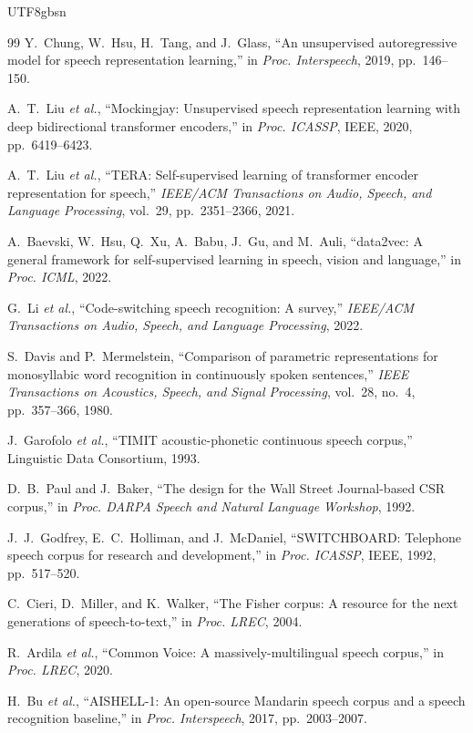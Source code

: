 \documentclass[12pt,a4paper]{article}
\newcommand{\etal}{\textit{et al.}}
\begin{document}
\begin{CJK}{UTF8}{gbsn}
\begin{thebibliography}{99}
Y.~Chung, W.~Hsu, H.~Tang, and J.~Glass,
``An unsupervised autoregressive model for speech representation learning,''
in \textit{Proc. Interspeech}, 2019, pp.~146--150.

A.~T.~Liu \etal,
``Mockingjay: Unsupervised speech representation learning with deep bidirectional transformer encoders,''
in \textit{Proc. ICASSP}, IEEE, 2020, pp.~6419--6423.

A.~T.~Liu \etal,
``TERA: Self-supervised learning of transformer encoder representation for speech,''
\textit{IEEE/ACM Transactions on Audio, Speech, and Language Processing}, vol.~29, pp.~2351--2366, 2021.

A.~Baevski, W.~Hsu, Q.~Xu, A.~Babu, J.~Gu, and M.~Auli,
``data2vec: A general framework for self-supervised learning in speech, vision and language,''
in \textit{Proc. ICML}, 2022.

G.~Li \etal,
``Code-switching speech recognition: A survey,''
\textit{IEEE/ACM Transactions on Audio, Speech, and Language Processing}, 2022.

S.~Davis and P.~Mermelstein,
``Comparison of parametric representations for monosyllabic word recognition in continuously spoken sentences,''
\textit{IEEE Transactions on Acoustics, Speech, and Signal Processing}, vol.~28, no.~4, pp.~357--366, 1980.

J.~Garofolo \etal,
``TIMIT acoustic-phonetic continuous speech corpus,''
Linguistic Data Consortium, 1993.

D.~B.~Paul and J.~Baker,
``The design for the Wall Street Journal-based CSR corpus,''
in \textit{Proc. DARPA Speech and Natural Language Workshop}, 1992.

J.~J.~Godfrey, E.~C.~Holliman, and J.~McDaniel,
``SWITCHBOARD: Telephone speech corpus for research and development,''
in \textit{Proc. ICASSP}, IEEE, 1992, pp.~517--520.

C.~Cieri, D.~Miller, and K.~Walker,
``The Fisher corpus: A resource for the next generations of speech-to-text,''
in \textit{Proc. LREC}, 2004.

R.~Ardila \etal,
``Common Voice: A massively-multilingual speech corpus,''
in \textit{Proc. LREC}, 2020.

H.~Bu \etal,
``AISHELL-1: An open-source Mandarin speech corpus and a speech recognition baseline,''
in \textit{Proc. Interspeech}, 2017, pp.~2003--2007.


\end{thebibliography}
\end{CJK}
\end{document}
